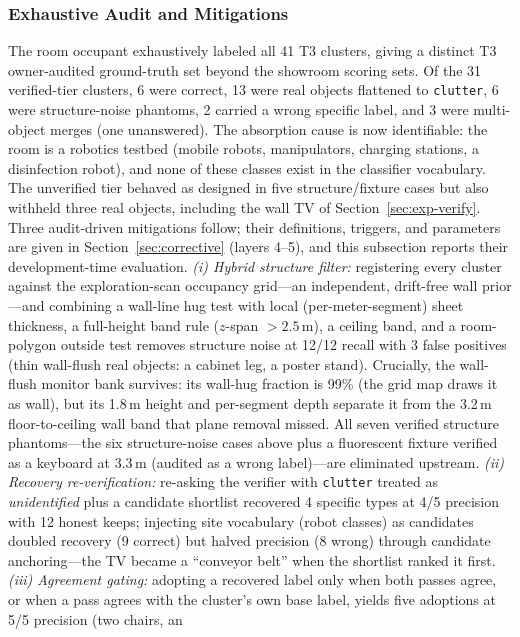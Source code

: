 \documentclass[electronics,article,accept,pdftex,moreauthors]{Definitions/mdpi}
\begin{document}
\subsubsection{Exhaustive Audit and Mitigations}
The room occupant exhaustively labeled all 41 T3 clusters, giving a
distinct T3 owner-audited ground-truth set beyond the showroom scoring
sets.
Of the 31 verified-tier clusters, 6 were correct, 13 were real objects
flattened to \texttt{clutter}, 6 were structure-noise phantoms, 2 carried
a wrong specific label, and 3 were multi-object merges (one unanswered).
The absorption cause is now identifiable: the room is a robotics testbed
(mobile robots, manipulators, charging stations, a disinfection robot),
and none of these classes exist in the classifier vocabulary. The
unverified tier behaved as designed in five structure/fixture cases but
also withheld three real objects, including the wall TV of
Section~\ref{sec:exp-verify}. Three audit-driven mitigations follow; their
definitions, triggers, and parameters are given in
Section~\ref{sec:corrective} (layers 4--5), and this subsection reports their
development-time evaluation.
\emph{(i) Hybrid structure filter:} registering every cluster against the
exploration-scan occupancy grid---an independent, drift-free wall prior---and combining a wall-line hug test with local (per-meter-segment)
sheet thickness, a full-height band rule ($z$-span $>2.5$\,m), a ceiling
band, and a room-polygon outside test removes structure noise at 12/12
recall with 3 false positives (thin wall-flush real objects: a cabinet
leg, a poster stand). Crucially, the wall-flush monitor bank survives:
its wall-hug fraction is 99\% (the grid map draws it as wall), but its
1.8\,m height and per-segment depth separate it from the 3.2\,m
floor-to-ceiling wall band that plane removal missed. All seven verified
structure phantoms---the six structure-noise cases above plus a
fluorescent fixture verified as a keyboard at 3.3\,m (audited as a wrong
label)---are eliminated upstream.
\emph{(ii) Recovery re-verification:} re-asking the verifier with
\texttt{clutter} treated as \emph{unidentified} plus a candidate
shortlist recovered 4 specific types at 4/5 precision with 12 honest
keeps; injecting site vocabulary (robot classes) as candidates doubled
recovery (9 correct) but halved precision (8 wrong) through candidate
anchoring---the TV became a ``conveyor belt'' when the shortlist ranked
it first. \emph{(iii) Agreement gating:} adopting a recovered label only
when both passes agree, or when a pass agrees with the cluster's own
base label, yields five adoptions at 5/5 precision (two chairs, an
\end{document}

